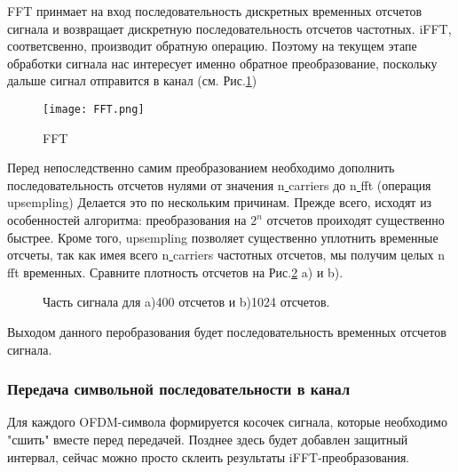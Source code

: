 \documentclass[a4paper,12pt]{article}
\begin{document}
FFT принмает на вход последовательность дискретных временных отсчетов сигнала и возвращает дискретную последовательность отсчетов частотных. iFFT,  соответсвенно, производит обратную операцию. 
Поэтому на текущем этапе обработки сигнала нас интересует именно обратное преобразование, поскольку дальше сигнал отправится в канал
(см. Рис.\ref{fg:fft})


\begin{figure}[h!]
\centering
\texttt{[image: FFT.png]}
\caption{FFT} \label{fg:fft}
\end{figure}

Перед непоследственно самим преобразованием необходимо дополнить последовательность отсчетов нулями от значения n\underline{ }carriers до n\underline{ }fft (операция upsempling)
Делается это по нескольким причинам.
Прежде всего, исходят из особенностей алгоритма: преобразования на $2^n$ отсчетов проиходят существенно быстрее. 
Кроме того, upsempling позволяет существенно уплотнить временные отсчеты, так как имея всего n\underline{ }carriers частотных отсчетов, мы получим целых n\underline{ }fft временных. 
Сравните плотность отсчетов на Рис.\ref{fg:fft400} a) и b).

\begin{figure}[H]
\begin{minipage}[h]{\linewidth}
\end{minipage}

\begin{minipage}[h]{\linewidth}
\end{minipage}
\caption{Часть сигнала для a)400 отсчетов и b)1024 отсчетов.}
\label{fg:fft400}
\end{figure}




Выходом данного перобразования будет последовательность временных отсчетов сигнала.

 \subsubsection*{Передача символьной последовательности в канал}
 
Для каждого OFDM-символа формируется косочек сигнала, которые необходимо "сшить" вместе перед передачей. 
Позднее здесь будет добавлен защитный интервал, сейчас можно просто склеить результаты iFFT-преобразования.
\end{document}
